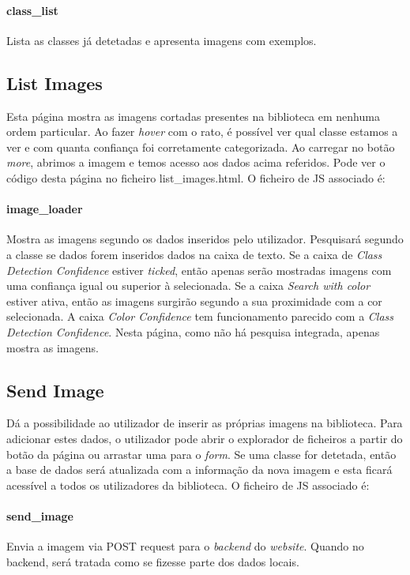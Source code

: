 \documentclass{report}
\begin{document}
\paragraph{class\_list} 
Lista as classes já detetadas e apresenta imagens com exemplos.

\subsection{List Images}
\label{listimages}
Esta página mostra as imagens cortadas presentes na biblioteca em nenhuma ordem particular. Ao fazer \textit{hover} com o rato, é possível ver qual classe estamos a ver e com quanta confiança foi corretamente categorizada. Ao carregar no botão \textit{more}, abrimos a imagem e temos acesso aos dados acima referidos. Pode ver o código desta página no ficheiro list\_images.html. O ficheiro de \ac{JS} associado é:
\paragraph{image\_loader}
Mostra as imagens segundo os dados inseridos pelo utilizador. Pesquisará segundo a classe se dados forem inseridos dados na caixa de texto. Se a caixa de \textit{Class Detection Confidence} estiver \textit{ticked}, então apenas serão mostradas imagens com uma confiança igual ou superior à selecionada. Se a caixa \textit{Search with color} estiver ativa, então as imagens surgirão segundo a sua proximidade com a cor selecionada. A caixa \textit{Color Confidence} tem funcionamento parecido com a \textit{Class Detection Confidence}. Nesta página, como não há pesquisa integrada, apenas mostra as imagens.


\subsection{Send Image}
Dá a possibilidade ao utilizador de inserir as próprias imagens na biblioteca. Para adicionar estes dados, o utilizador pode abrir o explorador de ficheiros a partir do botão da página ou arrastar uma para o \textit{form}. Se uma classe for detetada, então a base de dados será atualizada com a informação da nova imagem e esta ficará acessível a todos os utilizadores da biblioteca. O ficheiro de \ac{JS} associado é:
\paragraph{send\_image}
Envia a imagem via POST request para o \textit{backend} do \textit{website}. Quando no backend, será tratada como se fizesse parte dos dados locais.
\end{document}
